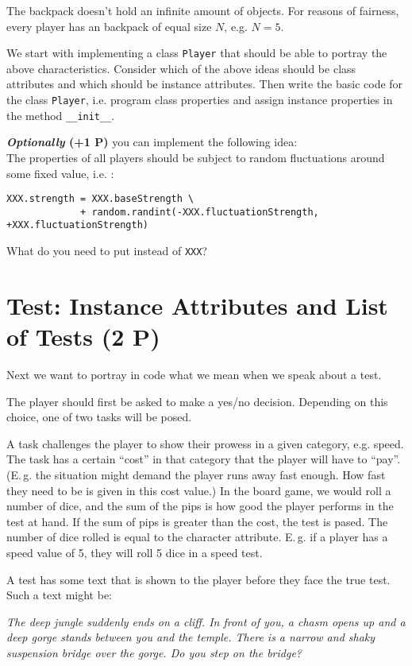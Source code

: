 \documentclass[
	english,
	fontsize=10pt,
	parskip=half,
	titlepage=true,
	DIV=12
]{scrartcl}
\newcommand*{\inPy}[1]{\texttt{#1}}
\newcommand*{\ie}{i.\;e. }
\newcommand*{\eg}{e.\;g. }
\begin{document}
The backpack doesn't hold an infinite amount of objects. For reasons of fairness, every player has an backpack of equal size $N$, \eg $N=5$.

We start with implementing a class \texttt{Player} that should be able to portray the above characteristics. Consider which of the above ideas should be class attributes and which should be instance attributes. Then write the basic code for the class \texttt{Player}, \ie program class properties and assign instance properties in the method \inPy{__init__}.

\textbf{\emph{Optionally} (+1 P)} you can implement the following idea:\\
The properties of all players should be subject to random fluctuations around some fixed value, \ie:
\begin{verbatim}
XXX.strength = XXX.baseStrength \
             + random.randint(-XXX.fluctuationStrength, +XXX.fluctuationStrength)
\end{verbatim}
What do you need to put instead of \texttt{XXX}?

\section{Test: Instance Attributes and List of Tests (2 P)}
Next we want to portray in code what we mean when we speak about a test.

The player should first be asked to make a yes/no decision. Depending on this choice, one of two tasks will be posed.

A task challenges the player to show their prowess in a given category, \eg speed. The task has a certain \enquote{cost} in that category that the player will have to \enquote{pay}. (E.\,g. the situation might demand the player runs away fast enough. How fast they need to be is given in this cost value.) In the board game, we would roll a number of dice, and the sum of the pips is how good the player performs in the test at hand. If the sum of pips is greater than the cost, the test is pased. The number of dice rolled is equal to the character attribute. E.\,g. if a player has a speed value of 5, they will roll 5 dice in a speed test.

A test has some text that is shown to the player before they face the true test. Such a text might be:
\begin{center}
	\emph{The deep jungle suddenly ends on a cliff. In front of you, a chasm opens up and a deep gorge stands between you and the temple. There is a narrow and shaky suspension bridge over the gorge. Do you step on the bridge?}
\end{center}
\end{document}
